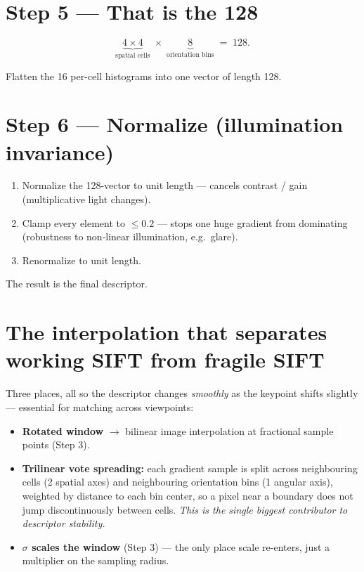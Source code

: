 \documentclass[11pt]{article}
\begin{document}
\section{Step 5 --- That is the 128}

\begin{keybox}
\[
\underbrace{4 \times 4}_{\text{spatial cells}} \;\times\; \underbrace{8}_{\text{orientation bins}}
\;=\; 128.
\]
\end{keybox}
Flatten the 16 per-cell histograms into one vector of length 128.

\section{Step 6 --- Normalize (illumination invariance)}

\begin{enumerate}[nosep]
  \item Normalize the 128-vector to unit length --- cancels contrast / gain (multiplicative
        light changes).
  \item Clamp every element to $\le 0.2$ --- stops one huge gradient from dominating
        (robustness to non-linear illumination, e.g.\ glare).
  \item Renormalize to unit length.
\end{enumerate}
The result is the final descriptor.

\section{The interpolation that separates working SIFT from fragile SIFT}

Three places, all so the descriptor changes \emph{smoothly} as the keypoint shifts slightly
--- essential for matching across viewpoints:
\begin{itemize}[nosep]
  \item \textbf{Rotated window} $\rightarrow$ bilinear image interpolation at fractional
        sample points (Step 3).
  \item \textbf{Trilinear vote spreading:} each gradient sample is split across neighbouring
        cells (2 spatial axes) and neighbouring orientation bins (1 angular axis), weighted
        by distance to each bin center, so a pixel near a boundary does not jump
        discontinuously between cells. \emph{This is the single biggest contributor to
        descriptor stability.}
  \item \textbf{$\sigma$ scales the window} (Step 3) --- the only place scale re-enters, just
        a multiplier on the sampling radius.
\end{itemize}
\end{document}
